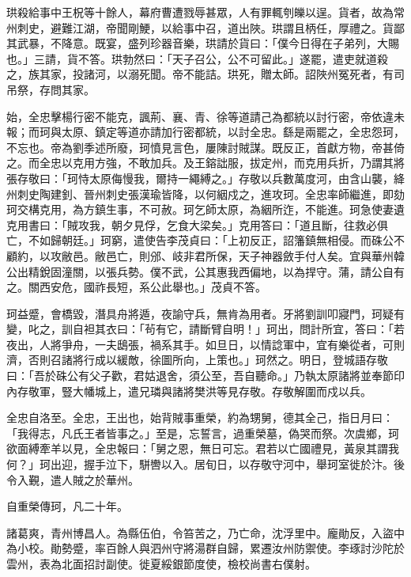\begin{pinyinscope}
 珙殺給事中王柷等十餘人，幕府曹遭戮辱甚眾，人有罪輒刳皪以逞。貨者，故為常州刺史，避難江湖，帝聞剛鯁，以給事中召，道出陜。珙謂且柄任，厚禮之。貨鄙其武暴，不降意。既宴，盛列珍器音樂，珙請於貨曰：「僕今日得在子弟列，大賜也。」三請，貨不答。珙勃然曰：「天子召公，公不可留此。」遂罷，遣吏就道殺之，族其家，投諸河，以溺死聞。帝不能詰。珙死，贈太師。詔陜州冤死者，有司吊祭，存問其家。



 始，全忠擊楊行密不能克，諷荊、襄、青、徐等道請己為都統以討行密，帝依違未報；而珂與太原、鎮定等道亦請加行密都統，以討全忠。繇是兩罷之，全忠怨珂，不忘也。帝為劉季述所廢，珂憤見言色，屢陳討賊謀。既反正，首獻方物，帝甚倚之。而全忠以克用方強，不敢加兵。及王鎔詘服，拔定州，而克用兵折，乃謂其將張存敬曰：「珂恃太原侮慢我，爾持一繩縛之。」存敬以兵數萬度河，由含山襲，絳州刺史陶建釗、晉州刺史張漢瑜皆降，以何絪戍之，進攻珂。全忠率師繼進，即劾珂交構克用，為方鎮生事，不可赦。珂乞師太原，為絪所迮，不能進。珂急使妻遺克用書曰：「賊攻我，朝夕見俘，乞食大梁矣。」克用答曰：「道且斷，往救必俱亡，不如歸朝廷。」珂窮，遣使告李茂貞曰：「上初反正，詔籓鎮無相侵。而硃公不顧約，以攻敝邑。敝邑亡，則邠、岐非君所保，天子神器斂手付人矣。宜與華州韓公出精銳固潼關，以張兵勢。僕不武，公其惠我西偏地，以為捍守。蒲，請公自有之。關西安危，國祚長短，系公此舉也。」茂貞不答。



 珂益蹙，會橋毀，潛具舟將遁，夜諭守兵，無肯為用者。牙將劉訓叩寢門，珂疑有變，叱之，訓自袒其衣曰：「茍有它，請斷臂自明！」珂出，問計所宜，答曰：「若夜出，人將爭舟，一夫鴟張，禍系其手。如旦日，以情諗軍中，宜有樂從者，可則濟，否則召諸將行成以緩敵，徐圖所向，上策也。」珂然之。明日，登城語存敬曰：「吾於硃公有父子歡，君姑退舍，須公至，吾自聽命。」乃執太原諸將並奉節印內存敬軍，豎大幡城上，遣兄璘與諸將樊洪等見存敬。存敬解圍而戍以兵。



 全忠自洛至。全忠，王出也，始背賊事重榮，約為甥舅，德其全己，指日月曰：「我得志，凡氏王者皆事之。」至是，忘誓言，過重榮墓，偽哭而祭。次虞鄉，珂欲面縛牽羊以見，全忠報曰：「舅之恩，無日可忘。君若以亡國禮見，黃泉其謂我何？」珂出迎，握手泣下，駢轡以入。居旬日，以存敬守河中，舉珂室徙於汴。後令入覲，遣人賊之於華州。



 自重榮傳珂，凡二十年。



 諸葛爽，青州博昌人。為縣伍伯，令笞苦之，乃亡命，沈浮里中。龐勛反，入盜中為小校。勛勢蹙，率百餘人與泗州守將湯群自歸，累遷汝州防禦使。李琢討沙陀於雲州，表為北面招討副使。徙夏綏銀節度使，檢校尚書右僕射。




\end{pinyinscope}
